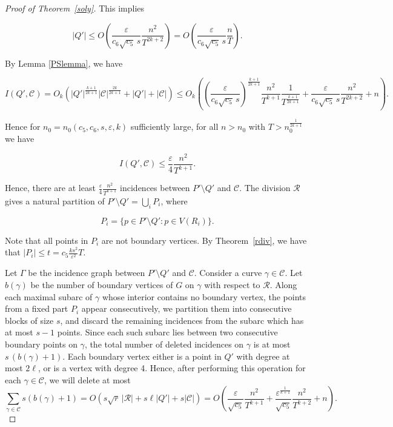 \documentclass[10pt,a4paper]{amsart}
\begin{document}
\begin{proof}[Proof of Theorem~\ref{soly}]
\noindent  This implies

\[
|Q'|
\le
O\!\left(
\frac{\varepsilon}{c_6\sqrt{c_5}\,s}
\frac{n^2}{T^{2k+2}}
\right)=O\!\left(
\frac{\varepsilon}{c_6\sqrt{c_5}\,s}
\frac{n}{T}
\right).
\]

\noindent By Lemma \ref{PSlemma}, we have

$$ I(Q',\mathcal C) = O_k\left(
|Q'|^{\frac{k + 1}{2k + 1}}
|\mathcal C|^{\frac{2k}{2k + 1}}
+|Q'|+|\mathcal  C|
\right) \leq  O_k\!\left(
\left(\frac{\varepsilon}{c_6\sqrt{c_5}\,s}\right)^{\frac{k+1}{2k+1}}
\frac{n^2}{T^{k+1}}\frac{1}{T^{\frac{k+1}{2k+1}}}
+
\frac{\varepsilon }{c_6\sqrt{c_5}\,s}\frac{n^2}{T^{2k+2}}
+
n
\right).$$

\noindent Hence for $n_0 = n_0(c_5,c_6,s, \varepsilon, k)$ sufficiently large, for all $n > n_0$ with $T>n^{\frac{1}{2k+1}}_0$ we have



\[
I(Q',\mathcal C) \leq \frac{\varepsilon}{4}\frac{n^2}{T^{k+1}}.\]



Hence, there are at least $\frac{\varepsilon}{4}\frac{n^2}{T^{k+1}}$ incidences between $P'\setminus Q'$ and $\mathcal C$.  The division $\mathcal R$ gives a natural partition of $P'\setminus Q' = \bigcup_i P_i$, where 

$$P_i = \{p \in P'\setminus Q': p \in V(R_i)\}.$$

\noindent  Note that all points in $P_i$ are not boundary vertices.   By Theorem~\ref{rdiv}, we have that $|P_i|  \leq t =  c_5\frac{ks^2}{\varepsilon^2}T$. 




Let $\Gamma$ be the incidence graph between $P'\setminus Q'$ and $\mathcal C$. Consider a curve $\gamma \in \mathcal{C}$.  Let $b(\gamma)$ be the number of boundary vertices of $G$ on $\gamma$ with respect to $\mathcal{R}$.  Along each maximal subarc of \(\gamma\) whose interior contains no boundary vertex, the points from a fixed part \(P_i\) appear consecutively, we partition them into consecutive blocks of size \(s\), and discard the remaining incidences from the subarc which has at most $s-1$ points. Since each such subarc lies between two consecutive boundary points on \(\gamma\), the total number of deleted incidences on \(\gamma\) is at most \(s\,(b(\gamma)+1)\).  Each boundary vertex either is a point in $Q'$ with degree at most $2\ell$, or is a vertex with degree 4. Hence, after performing this operation for each $\gamma \in \mathcal C$, we will delete at most
\[
\sum\limits_{\gamma \in \mathcal C} s(b(\gamma)  +1)  = O\!\left(s\sqrt r\,|\mathcal R|+s\ell|Q'|+s|\mathcal C|\right)
=
O\!\left(
\frac{\varepsilon}{\sqrt{c_5}}
\frac{n^2}{T^{k+1}}
+
\frac{\varepsilon^{\frac{1}{k+1}}}{\sqrt{c_5}}
\frac{n^2}{T^{k+2}}+n
\right).
\]
 

\end{proof}
\end{document}
